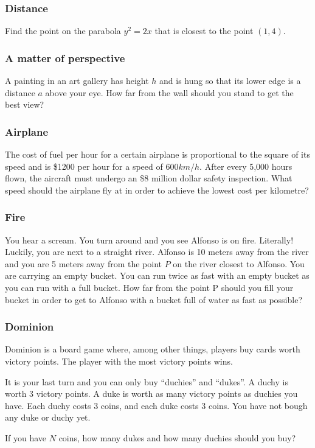 \begin{frame}[t]
	\frametitle{Distance}

	Find the point on the parabola $y^{2}=2x$ that is closest to the point $(1,4)$.
\end{frame}

\begin{frame}[t]
	\frametitle{A matter of perspective}

	A painting in an art gallery has height $h$ and is hung so that its lower edge
	is a distance $a$ above your eye. How far from the wall should you stand to get
	the best view?
\end{frame}

\begin{frame}[t]
	\frametitle{Airplane}

	The cost of fuel per hour for a certain airplane is proportional to the square
	of its speed and is \$1200 per hour for a speed of 600$km/h$. After every 5,000
	hours flown, the aircraft must undergo an \$8 million dollar safety inspection.
	What speed should the airplane fly at in order to achieve the lowest cost per
	kilometre?
\end{frame}

\begin{frame}[t]
	\frametitle{Fire}

	You hear a scream. You turn around and you see Alfonso is on fire. Literally! Luckily,
	you are next to a straight river. Alfonso is 10 meters away from the river and
	you are 5 meters away from the point $P$ on the river closest to Alfonso. You
	are carrying an empty bucket. You can run twice as fast with an empty bucket as
	you can run with a full bucket. How far from the point P should you fill your
	bucket in order to get to Alfonso with a bucket full of water as fast as
	possible?

\end{frame}

\begin{frame}[t]
	\frametitle{Dominion}

	Dominion is a board game where, among other things, players buy cards worth
	victory points. The player with the most victory points wins.

	It is your last turn and you can only buy ``duchies'' and ``dukes''. A duchy
	is worth 3 victory points. A duke is worth as many victory points as duchies you
	have. Each duchy costs 3 coins, and each duke costs 3 coins. You have not
	bough any duke or duchy yet.

	If you have $N$ coins, how many dukes and how many duchies should you buy?
\end{frame}

